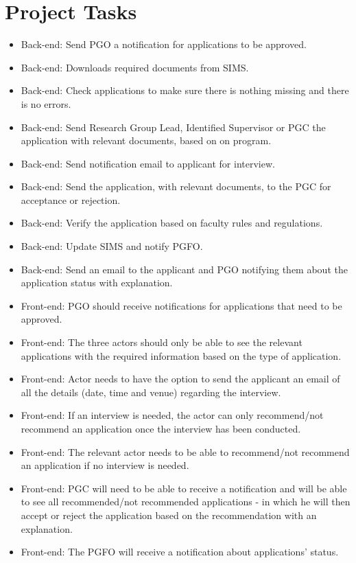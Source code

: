 \documentclass{article}
\begin{document}
\section*{Project Tasks}
\begin{itemize}
\item Back-end: Send PGO a notification for applications to be approved.
\item Back-end: Downloads required documents from SIMS.
\item Back-end: Check applications to make sure there is nothing missing and there is no
errors.
\item Back-end: Send Research Group Lead, Identified Supervisor or PGC the application
with relevant documents, based on on program.
\item Back-end: Send notification email to applicant for interview.
\item Back-end: Send the application, with relevant documents, to the PGC for acceptance
or rejection.
\item Back-end: Verify the application based on faculty rules and regulations.
\item Back-end: Update SIMS and notify PGFO.
\item Back-end: Send an email to the applicant and PGO notifying them about the
application status with explanation.
\item Front-end: PGO should receive notifications for applications that need to be
approved.
\item Front-end: The three actors should only be able to see the relevant applications with
the required information based on the type of application.
\item Front-end: Actor needs to have the option to send the applicant an email of all the
details (date, time and venue) regarding the interview.
\item Front-end: If an interview is needed, the actor can only recommend/not recommend
an application once the interview has been conducted.
\item Front-end: The relevant actor needs to be able to recommend/not recommend an
application if no interview is needed.
\item Front-end: PGC will need to be able to receive a notification and will be able to see
all recommended/not recommended applications - in which he will then accept or
reject the application based on the recommendation with an explanation.
\item Front-end: The PGFO will receive a notification about applications’ status.
\end{itemize}
\end{document}
